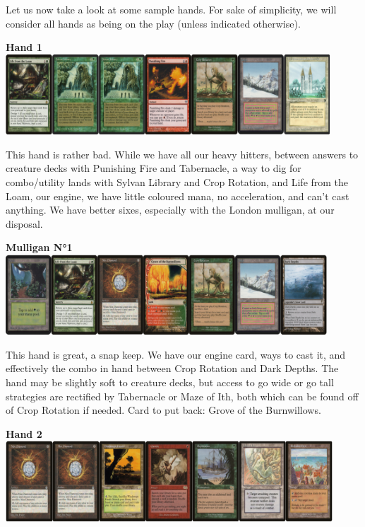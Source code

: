 \documentclass{report}
\begin{document}
Let us now take a look at some sample hands. For sake of simplicity, we will consider all hands as being on the play (unless indicated otherwise).\\
\begin{center}
\textbf{Hand 1\\}
\includegraphics [width =\textwidth, height = 3cm] {rghand1}
\end{center}
This hand is rather bad. While we have all our heavy hitters, between answers to creature decks with Punishing Fire and Tabernacle, a way to dig for combo/utility lands with Sylvan Library and Crop Rotation, and Life from the Loam, our engine, we have little coloured mana, no acceleration, and can't cast anything. We have better sixes, especially with the London mulligan, at our disposal.
\begin{center}
\textbf{Mulligan N°1\\}
\includegraphics [width =\textwidth, height = 3cm] {rgmull1}
\end{center}
This hand is great, a snap keep. We have our engine card, ways to cast it, and effectively the combo in hand between Crop Rotation and Dark Depths. The hand may be slightly soft to creature decks, but access to go wide or go tall strategies are rectified by Tabernacle or Maze of Ith, both which can be found off of Crop Rotation if needed. 
Card to put back: Grove of the Burnwillows.
\begin{center}
\textbf{Hand 2\\}
\includegraphics [width =\textwidth, height = 3cm] {rghand2}
\end{center}
\end{document}
